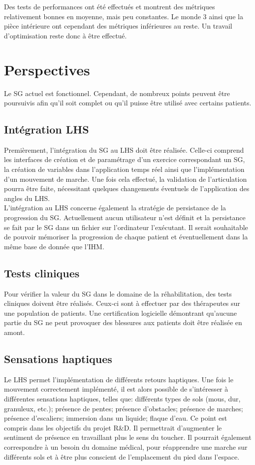 Des tests de performances ont été effectués et montrent des métriques relativement bonnes en moyenne, mais peu constantes. Le monde 3 ainsi que la pièce intérieure ont cependant des métriques inférieures au reste. Un travail d'optimisation reste donc à être effectué.
\newpage

\section{Perspectives}
	Le SG actuel est fonctionnel. Cependant, de nombreux points peuvent être poursuivis afin qu'il soit complet ou qu'il puisse être utilisé avec certains patients.
	
	\subsection*{Intégration LHS}
		Premièrement, l'intégration du SG au LHS doit être réalisée. Celle-ci comprend les interfaces de création et de paramétrage d'un exercice correspondant un SG, la création de variables dans l'application temps réel ainsi que l'implémentation d'un mouvement de marche. Une fois cela effectué, la validation de l'articulation pourra être faite, nécessitant quelques changements éventuels de l'application des angles du LHS.
		\\
		
		L'intégration au LHS concerne également la stratégie de persistance de la progression du SG. Actuellement aucun utilisateur n'est définit et la persistance se fait par le SG dans un fichier sur l'ordinateur l'exécutant. Il serait souhaitable de pouvoir mémoriser la progression de chaque patient et éventuellement dans la même base de donnée que l'IHM.
		
	\subsection*{Tests cliniques}
		Pour vérifier la valeur du SG dans le domaine de la réhabilitation, des tests cliniques doivent être réalisés. Ceux-ci sont à effectuer par des thérapeutes sur une population de patients. Une certification logicielle démontrant qu'aucune partie du SG ne peut provoquer des blessures aux patients doit être réalisée en amont.
	
	\subsection*{Sensations haptiques} 
		Le LHS permet l'implémentation de différents retours haptiques. Une fois le mouvement correctement implémenté, il est alors possible de s'intéresser à différentes sensations haptiques, telles que: différents types de sols (mous, dur, granuleux, etc.); présence de pentes; présence d'obstacles; présence de marches; présence d'escaliers; immersion dans un liquide; flaque d'eau. Ce point est compris dans les objectifs du projet R\&D. Il permettrait d'augmenter le sentiment de présence en travaillant plus le sens du toucher. Il pourrait également correspondre à un besoin du domaine médical, pour réapprendre une marche sur différents sols et à être plus conscient de l'emplacement du pied dans l'espace.
		
